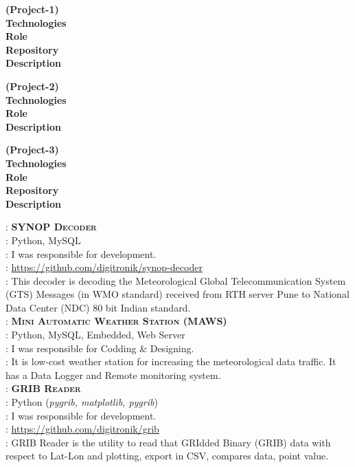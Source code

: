 \documentclass[a4paper,10pt]{memoir} %
\begin{document}
\Sep
\begin{minipage}[t]{0.20\columnwidth}
\textbf{(Project-1)}\\
\textbf{Technologies}\\
\textbf{Role}\\
\textbf{Repository}\\
\textbf{Description}

\vspace{13mm}

\textbf{(Project-2)}\\
\textbf{Technologies}\\
\textbf{Role}\\
\textbf{Description}

\vspace{8.1 mm}

\textbf{(Project-3)}\\
\textbf{Technologies}\\
\textbf{Role}\\
\textbf{Repository}\\
\textbf{Description}\\

\end{minipage}
\hfill
\begin{minipage}[t]{0.80\columnwidth}
: \textbf{\textsc{SYNOP Decoder}}\\
: Python, MySQL\\
: I was responsible for development.\\
: \url{https://github.com/digitronik/synop-decoder}\\
: This decoder is decoding the Meteorological Global Telecommunication System (GTS) 
Messages (in WMO standard) received from RTH server Pune to National Data Center (NDC) 80 bit Indian standard. \\

: \textbf{\textsc{Mini Automatic Weather Station} (MAWS)}\\
: Python, MySQL, Embedded, Web Server \\
: I was responsible for Codding \& Designing.\\
: It is low-cost weather station for increasing the meteorological data traffic. 
It has a Data Logger and Remote monitoring system.\\

: \textbf{\textsc{GRIB Reader}}\\
: Python (\textit{pygrib, matplotlib, pygrib})\\
: I was responsible for development.\\
: \url{https://github.com/digitronik/grib}\\
: GRIB Reader is the utility to read that GRIdded Binary (GRIB) data with respect to Lat-Lon and plotting, export in CSV, compares data, point value.\\
\end{minipage}
\end{document}
